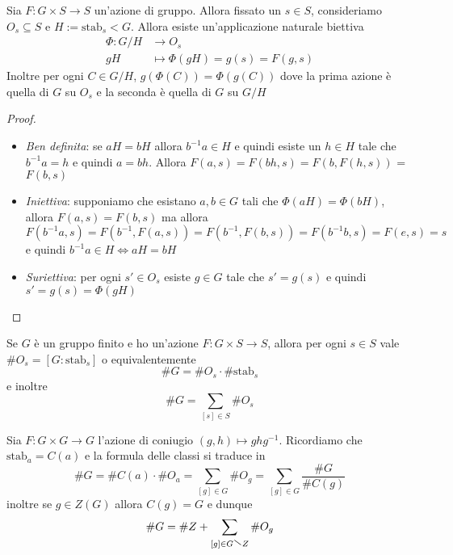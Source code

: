 \begin{proposition}
    Sia \(F : G \times  S \to S\) un'azione di gruppo. Allora fissato un \(s \in
    S\), consideriamo \(O_s \subseteq   S\) e \(H := \mathrm{stab}_s < G\). Allora esiste
    un'applicazione naturale biettiva
    \begin{align*}
        \Phi: G / H &\longrightarrow O_s \\
        gH &\longmapsto \Phi(gH) = g{(s)} = F(g, s)
    \end{align*}
    Inoltre per ogni \(C \in G / H\), \(g{(\Phi{(C)})} = \Phi{(g{(C)})}\) dove
    la prima azione è quella di \(G\) su \(O_s\) e la seconda è quella di \(G\)
    su \(G / H\)
\end{proposition}
\begin{proof} \(\) 
    \begin{itemize}[label = --]
        \item \emph{Ben definita}: se \(aH = bH\) allora \(b^{-1}a \in H\) e
            quindi esiste un \(h \in H\) tale che \(b^{-1}a = h\) e quindi \(a =
            bh\). Allora \(F{(a, s)} = F{(bh, s)} = F{(b, F{(h, s)})}\) =
            \(F{(b, s)}\) 
        \item \emph{Iniettiva}: supponiamo che esistano \(a, b \in G\) tali che
            \(\Phi{(aH)} = \Phi{(bH)}\), allora \(F{(a, s)} = F{(b, s)}\) ma
            allora
            \[
                F{(b^{-1}a, s)} = F{(b^{-1}, F{(a, s)})} = F{(b^{-1}, F{(b,
                s)})} = F{(b^{-1}b, s)} = F{(e, s)} = s
            \]
            e quindi \(b^{-1}a \in H \iff aH = bH\) 
        \item \emph{Suriettiva}: per ogni \(s' \in O_s\) esiste \(g \in G\) tale
            che \(s' = g{(s)}\) e quindi \(s' = g{(s)} = \Phi(gH)\)
    \end{itemize}
\end{proof}
\begin{corollary}
    Se \(G\) è un gruppo finito e ho un'azione \(F : G \times S \to S\), allora
    per ogni \(s \in S\) vale \(\# O_s = [G : \text{stab}_s]\) o
    equivalentemente
    \[
        \# G = \# O_s \cdot \# \mathrm{stab}_s
    \]
    e inoltre
    \[
        \# G = \sum_{[s] \in S} \# O_s
    \]
\end{corollary}
\begin{corollary}\label{cor:classi_coniugio}
    Sia \(F : G \times G \to G\) l'azione di coniugio \({(g, h)} \mapsto
    ghg^{-1}\). Ricordiamo che \(\mathrm{stab}_a = C{(a)}\) e la formula delle
    classi si traduce in 
    \[
        \# G = \# C{(a)} \cdot \# O_a = \sum_{[g] \in G} \# O_g = \sum_{[g] \in
        G} \frac{\# G}{\# C{(g)}}
    \]
    inoltre se \(g \in Z{(G)}\) allora \(C{(g)} = G\) e dunque
    \[
        \# G = \# Z + \sum_{[g] \in G\sminus Z} \# O_g
    \]
\end{corollary}
